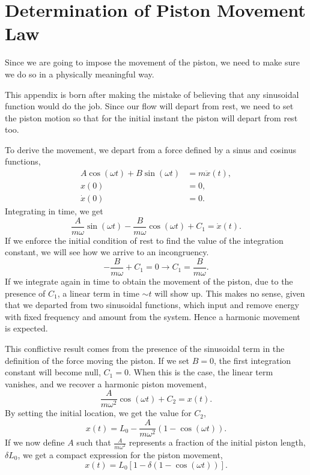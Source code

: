 \documentclass[../../thesis.tex]{subfiles}
\begin{document}
\section{Determination of Piston Movement Law}
Since we are going to impose the movement of the piston, we need to make sure 
we do so in a physically meaningful way.

This appendix is born after making the mistake of believing that any sinusoidal function would do the job.
Since our flow will depart from rest, 
we need to set the piston motion so that for the initial instant the piston will depart from rest too.

To derive the movement, we depart from a force defined by a sinus and cosinus functions,
\begin{subequations}
\begin{align}
        A \cos(\omega t) + B \sin(\omega t) &= m \ddot{x}(t), 
        \\
        x(0) &= 0, 
        \\
        \dot{x}(0) &= 0.
\end{align}
\end{subequations}
Integrating in time, we get
\begin{equation}
    \frac{A}{m \omega} \sin(\omega t) - \frac{B}{m \omega} \cos(\omega t) + C_1 = \dot{x}(t).
\end{equation}
If we enforce the initial condition of rest to find the value of the integration constant, 
we will see how we arrive to an incongruency.
\begin{equation}
    - \frac{B}{m \omega} + C_1 = 0 \rightarrow C_1 = \frac{B}{m \omega}.
\end{equation}
If we integrate again in time to obtain the movement of the piston, due to the presence of $C_1$, 
a linear term in time $\sim t$ will show up.
This makes no sense, given that we departed from two sinusoidal functions, which input and remove energy
with fixed frequency and amount from the system. 
Hence a harmonic movement is expected.

This conflictive result comes from the presence of the sinusoidal term in the definition of the force moving the piston.
If we set $B=0$, the first integration constant will become null, $C_1=0$. 
When this is the case, the linear term vanishes, and we recover a harmonic piston movement,
\begin{equation}
    \frac{A}{m \omega^2} \cos(\omega t) + C_2 = x(t).
\end{equation}
By setting the initial location, we get the value for $C_2$,
\begin{equation}
    x(t) = L_0 - \frac{A}{m \omega^2} \left(1 - \cos(\omega t)\right).
\end{equation}
If we now define $A$ such that $\frac{A}{m \omega^2}$ represents a fraction of the initial piston length, $\delta L_0$, 
we get a compact expression for the piston movement,
\begin{equation}
    x(t) = L_0\left[1 - \delta \left(1 - \cos(\omega t)\right)\right].
\end{equation}
\end{document}
